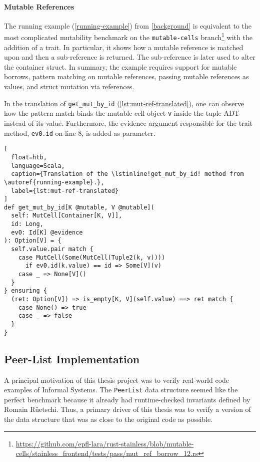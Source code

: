 \paragraph{Mutable References}

The running example (\autoref{running-example}) from \autoref{background} is
equivalent to the most complicated mutability benchmark on the
\texttt{mutable-cells}
branch\footnote{\url{https://github.com/epfl-lara/rust-stainless/blob/mutable-cells/stainless_frontend/tests/pass/mut_ref_borrow_12.rs}}
with the addition of a trait. In particular, it shows how a mutable reference is
matched upon and then a sub-reference is returned. The sub-reference is later
used to alter the container struct. In summary, the example requires support for
mutable borrows, pattern matching on mutable references, passing mutable
references as values, and struct mutation via references.

In the translation of \lstinline!get_mut_by_id!
(\autoref{lst:mut-ref-translated}), one can observe how the pattern match binds
the mutable cell object \lstinline!v! inside the tuple ADT instead of its value.
Furthermore, the evidence argument responsible for the trait method,
\lstinline!ev0.id! on line 8, is added as parameter.

\begin{lstlisting}[
  float=htb,
  language=Scala,
  caption={Translation of the \lstinline!get_mut_by_id! method from \autoref{running-example}.},
  label={lst:mut-ref-translated}
]
def get_mut_by_id[K @mutable, V @mutable](
  self: MutCell[Container[K, V]],
  id: Long,
  ev0: Id[K] @evidence
): Option[V] = {
  self.value.pair match {
    case MutCell(Some(MutCell(Tuple2(k, v))))
      if ev0.id(k.value) == id => Some[V](v)
    case _ => None[V]()
  }
} ensuring {
  (ret: Option[V]) => is_empty[K, V](self.value) ==> ret match {
    case None() => true
    case _ => false
  }
}
\end{lstlisting}

\subsection{Peer-List Implementation}
\label{peerlist}

A principal motivation of this thesis project was to verify real-world code
examples of Informal Systems. The \lstinline!PeerList! data structure seemed
like the perfect benchmark because it already had runtime-checked invariants
defined by Romain Rüetschi. Thus, a primary driver of this thesis was to verify
a version of the data structure that was as close to the original code as
possible.

